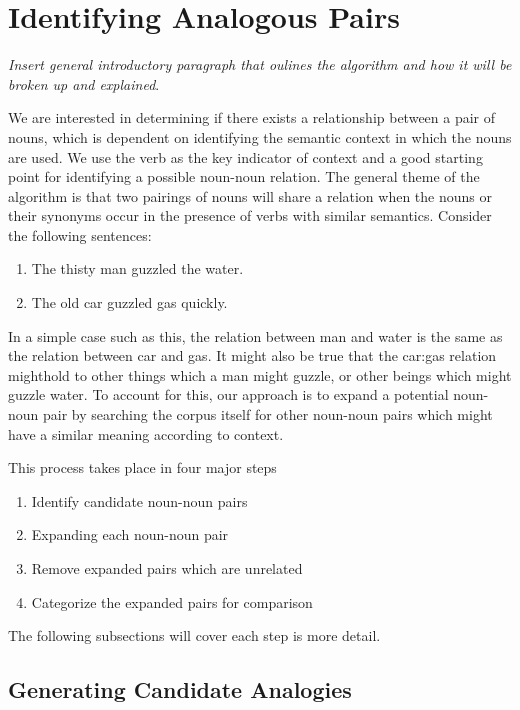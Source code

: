 \documentclass[11pt]{article}
\begin{document}
\section{Identifying Analogous Pairs}
\label{sec:identifying}

\emph{Insert general introductory paragraph that oulines the algorithm and how
  it will be broken up and explained}.

We are interested in determining if there exists a relationship between a pair
of nouns, which is dependent on identifying the semantic context in which the
nouns are used.  We use the verb as the key indicator of context and a good
starting point for identifying a possible noun-noun relation.  The general theme
of the algorithm is that two pairings of nouns will share a relation when the
nouns or their synonyms occur in the presence of verbs with similar semantics.
Consider the following sentences:
\begin{enumerate}
  \item The thisty man guzzled the water.
  \item The old car guzzled gas quickly.
\end{enumerate}

In a simple case such as this, the relation between man and water is the same as
the relation between car and gas.  It might also be true that the car:gas
relation mighthold to other things which a man might guzzle, or other beings which
might guzzle water.  To account for this, our approach is to expand a potential
noun-noun pair by searching the corpus itself for other noun-noun pairs which
might have a similar meaning according to context.

This process takes place in four major steps
\begin{enumerate}
  \item Identify candidate noun-noun pairs
  \item Expanding each noun-noun pair
  \item Remove expanded pairs which are unrelated
  \item Categorize the expanded pairs for comparison
\end{enumerate}

The following subsections will cover each step is more detail.

\subsection{Generating Candidate Analogies}
\end{document}
